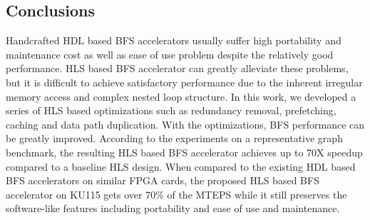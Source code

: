 \subsection{Conclusions}
Handcrafted HDL based BFS accelerators usually suffer 
high portability and maintenance cost 
as well as ease of use problem despite the relatively 
good performance. HLS based BFS accelerator can greatly 
alleviate these problems, but it is 
difficult to achieve satisfactory performance due to 
the inherent irregular memory access and 
complex nested loop structure. In this work, we developed 
a series of HLS based optimizations such as redundancy removal, 
prefetching, caching and data path duplication. 
With the optimizations, BFS performance can be greatly improved. 
According to the experiments on 
a representative graph benchmark, the resulting HLS based BFS accelerator 
achieves up to 70X speedup compared to a baseline HLS design. 
When compared to the existing HDL based BFS accelerators on 
similar FPGA cards, the proposed HLS based BFS accelerator on KU115 
gets over 70\% of the MTEPS while it still preserves the 
software-like features including portability and ease of use 
and maintenance.  
